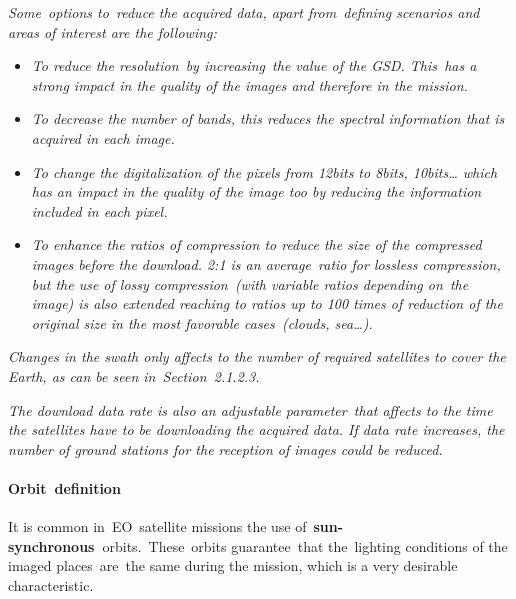 \documentclass[a4paper]{article}
\newcommand\liststyleLFOii{%
\renewcommand\labelitemi{[F0B7?]}
\renewcommand\labelitemii{o}
\renewcommand\labelitemiii{[F0A7?]}
\renewcommand\labelitemiv{[F0B7?]}
}
\begin{document}
\bigskip

{\itshape
Some\ options to\ reduce the acquired data, apart from\ defining
scenarios and areas of interest are the following:}

\liststyleLFOii
\begin{itemize}
\item {\itshape
To reduce the resolution\ by increasing\ the value of the GSD. This\ has
a strong impact in the quality of the images and therefore in the
mission.}
\item {\itshape
To decrease the number of bands, this reduces the spectral information
that is acquired in each image.}
\item {\itshape
To change the digitalization of the pixels from 12bits to 8bits,
10bits{\dots} which has an impact in the quality of the image too by
reducing the information included in each pixel.}
\item {\itshape
To enhance the ratios of compression to reduce the size of the
compressed images before the download. 2:1 is an average\ ratio for
lossless compression, but the use of lossy compression\ (with variable
ratios depending on\ the image) is also extended reaching to ratios up
to 100 times of reduction of the original size in the most favorable
cases\ (clouds, sea{\dots}).}
\end{itemize}

\bigskip

\textit{Changes in the swath only affects to the number of required
satellites to cover the Earth, as can be seen
in}\textit{\ Section}\textit{\ }\textit{2.1.2.3}\textit{.}


\bigskip

{\itshape
The download data rate is also an adjustable parameter\ that affects to
the time the satellites have to be downloading the acquired data. If
data rate increases, the number of ground stations for the reception of
images could be reduced.}


\bigskip

\paragraph[Orbit\ definition]{Orbit\ definition}
It is common in\ EO\ satellite missions the use
of\ \textbf{sun-synchronous}\textbf{\ }orbits.\ These\ orbits
guarantee\ that the\ lighting conditions of the imaged places\ are\ the
same during the mission, which is a very desirable characteristic.\ 


\bigskip
\end{document}
